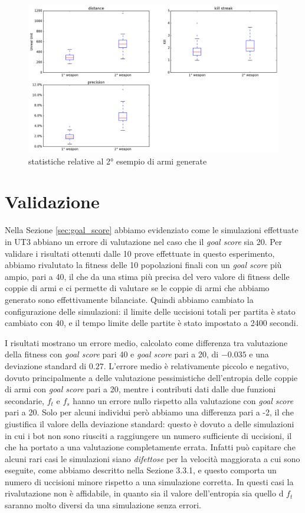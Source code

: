 \documentclass[12pt, italian]{toptesi}
\begin{document}
\begin{figure}[tp]
\centering
\includegraphics[width=1.0\textwidth]{stat_radar_2}
\caption{statistiche relative al 2° esempio di armi generate}
\label{fig:stat_radar_2}
\end{figure}


\section{Validazione}
\label{sec:error_single_obj}
Nella Sezione \ref{sec:goal_score} abbiamo evidenziato come le simulazioni effettuate in UT3 abbiano un errore di valutazione nel caso che il \emph{goal score} sia 20.
Per validare i risultati ottenuti dalle 10 prove effettuate in questo esperimento, abbiamo rivalutato la fitness delle 10 popolazioni finali con un \emph{goal score} più ampio, pari a 40, il che da una stima più precisa del vero valore di fitness delle coppie di armi e ci permette di valutare se le coppie di armi che abbiamo generato sono effettivamente bilanciate.
Quindi abbiamo cambiato la configurazione delle simulazioni: il limite delle uccisioni totali per partita è stato cambiato con 40, e il tempo limite delle partite è stato impostato a 2400 secondi.

I risultati mostrano un errore medio, calcolato come differenza tra valutazione della fitness con \emph{goal score} pari 40 e \emph{goal score} pari a 20, di $-0.035$ e una deviazione standard di $0.27$.
L'errore medio è relativamente piccolo e negativo, dovuto principalmente a delle valutazione pessimistiche dell'entropia delle coppie di armi con \emph{goal score} pari a 20, mentre i contributi dati dalle due funzioni secondarie, $f_t$ e $f_s$ hanno un errore nullo rispetto alla valutazione con \emph{goal score} pari a 20.
Solo per alcuni individui però abbiamo una differenza pari a -2, il che giustifica il valore della deviazione standard: questo è dovuto a delle simulazioni in cui i bot non sono riusciti a raggiungere un numero sufficiente di uccisioni, il che ha portato a una valutazione completamente errata. Infatti può capitare che alcuni rari casi le simulazioni siano \emph{difettose} per la velocità maggiorata a cui sono eseguite, come abbiamo descritto nella Sezione 3.3.1, e questo comporta un numero di uccisioni minore rispetto a una simulazione corretta. In questi casi la rivalutazione non è affidabile, in quanto sia il valore dell'entropia sia quello d $f_t$ saranno molto diversi da una simulazione senza errori.
\end{document}
